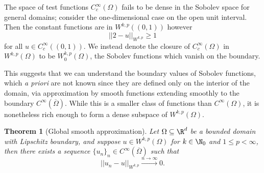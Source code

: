 \documentclass[reqno]{amsart}
\newtheorem{theorem}{Theorem}
\theoremstyle{definition}
\theoremstyle{remark}
\begin{document}
	The space of test functions $C^\infty_c (\Omega)$ fails to be dense in the Sobolev space for general domains; consider the one-dimensional case on the open unit interval. Then the constant functions are in $W^{k, p} ((0, 1))$ however 
		\[ ||2 - u||_{W^{k, p}} \geq 1\]
	for all $u \in C^\infty_c ((0, 1))$. We instead denote the closure of $C^\infty_c (\Omega)$ in $W^{k, p} (\Omega)$ to be $W^{k, p}_0 (\Omega)$, the Sobolev functions which vanish on the boundary. 
	
	This suggests that we can understand the boundary values of Sobolev functions, which \textit{a priori} are not known since they are defined only on the interior of the domain, via approximation by smooth functions extending smoothly to the boundary $C^\infty (\overline\Omega)$. While this is a smaller class of functions than $C^\infty (\Omega)$, it is nonetheless rich enough to form a dense subspace of $W^{k, p} (\Omega)$. 

\begin{theorem}[Global smooth approximation]
	Let $\Omega \subseteq \R^d$ be a bounded domain with Lipschitz boundary, and suppose $u \in W^{k, p} (\Omega)$ for $k \in \N_0$ and $1 \leq p < \infty$, then there exists a sequence $\{u_n\}_n \in C^\infty (\overline\Omega)$ such that 
		\[ ||u_n - u||_{W^{k, p}} \overset{n \to \infty}{\longrightarrow} 0. \]
\end{theorem}
\end{document}
